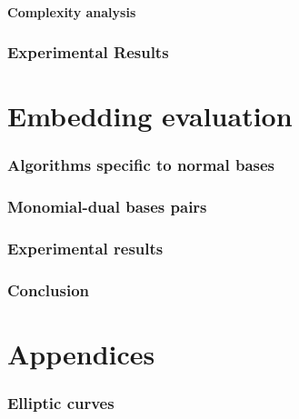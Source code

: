 \documentclass[12pt]{article}
\theoremstyle{plain}
\theoremstyle{definition}
\begin{document}
\subsection{Complexity analysis}

\section{Experimental Results}


\part{Embedding evaluation}


\section{Algorithms specific to normal bases}


\section{Monomial-dual bases pairs}


\section{Experimental results}


\section{Conclusion}


\appendix
\part*{Appendices}


\section{Elliptic curves}
\label{app:elliptic-curves}
\end{document}

